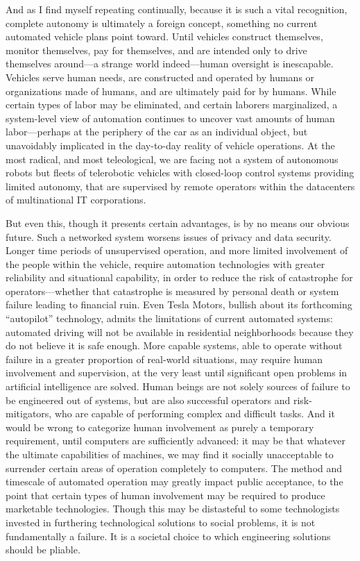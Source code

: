 And as I find myself repeating continually, because it is such a vital
recognition, complete autonomy is ultimately a foreign concept,
something no current automated vehicle plans point toward. Until
vehicles construct themselves, monitor themselves, pay for themselves,
and are intended only to drive themselves around---a strange world
indeed---human oversight is inescapable. Vehicles serve human needs,
are constructed and operated by humans or organizations made of
humans, and are ultimately paid for by humans. While certain types of
labor may be eliminated, and certain laborers marginalized, a
system-level view of automation continues to uncover vast amounts of
human labor---perhaps at the periphery of the car as an individual
object, but unavoidably implicated in the day-to-day reality of
vehicle operations. At the most radical, and most teleological, we are
facing not a system of autonomous robots but fleets of telerobotic
vehicles with closed-loop control systems providing limited autonomy,
that are supervised by remote operators within the datacenters of
multinational IT corporations. 


But even this, though it presents certain advantages, is by no means
our obvious future. Such a networked system worsens issues of privacy
and data security. Longer time periods of unsupervised operation, and
more limited involvement of the people within the vehicle, require
automation technologies with greater reliability and situational
capability, in order to reduce the risk of catastrophe for
operators---whether that catastrophe is measured by personal death or
system failure leading to financial ruin. Even Tesla Motors, bullish
about its forthcoming ``autopilot'' technology, admits the limitations
of current automated systems: automated driving will not be available
in residential neighborhoods because they do not believe it is safe
enough\cite{???-http://www.slashgear.com/tesla-model-s-autopilot-update-due-in-3-4-months-19374458/}.
More capable systems, able to operate without failure in a greater
proportion of real-world situations, may require human involvement and
supervision, at the very least until significant open problems in
artificial intelligence are solved. Human beings are not solely
sources of failure to be engineered out of systems, but are also
successful operators and risk-mitigators, who are capable of
performing complex and difficult tasks. And it would be wrong to
categorize human involvement as purely a temporary requirement, until
computers are sufficiently advanced:  it
may be that whatever the ultimate capabilities of machines, we may
find it socially unacceptable to surrender certain areas of operation
completely to computers. The method and timescale of automated
operation may greatly impact 
public acceptance, to the point that certain types of human
involvement may be required to produce marketable technologies. Though
this may be distasteful to some technologists invested in furthering
technological solutions to social problems, it is not fundamentally
a failure. It is a societal choice to which engineering solutions
should be pliable.

